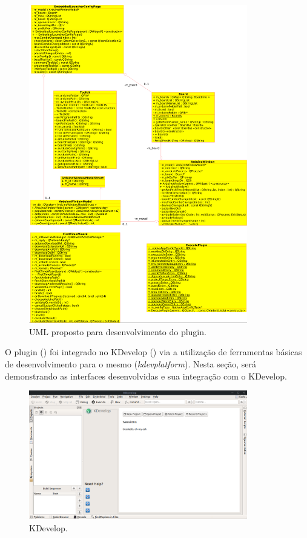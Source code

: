 \begin{figure}[!htb]
  \centering
  \includegraphics[width=0.85\textwidth]{figuras/uml.png}
  \caption[UML proposto]{UML proposto para desenvolvimento do plugin.}
  \label{fig:uml}
\end{figure}


O plugin () foi integrado no KDevelop () via a utilização de ferramentas básicas de desenvolvimento para o mesmo (\textit{kdevplatform}). Nesta seção, será demonstrando as interfaces desenvolvidas e sua integração com o KDevelop.

\begin{figure}[!htb]
  \centering
  \includegraphics[width=0.85\textwidth]{figuras/kdevelop.png}
    \caption[KDevelop]{KDevelop.}
    \label{fig:kdevelop}
\end{figure}

